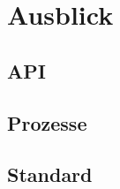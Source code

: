 \newpage
\restoregeometry
\section{Ausblick}
\subsection{API}
\subsection{Prozesse}
\subsection{Standard}


